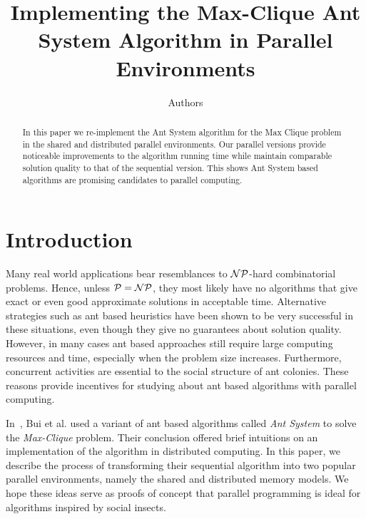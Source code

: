 \documentclass[11pt]{article}
\begin{document}
  

\title{Implementing the Max-Clique Ant System Algorithm in Parallel Environments} 
\author{
Authors\\
}  
\maketitle  
 

\begin{abstract}
In this paper we re-implement the Ant System algorithm for the Max Clique problem~\cite{BR} in the shared and distributed parallel environments. Our parallel versions provide noticeable improvements to the algorithm running time while maintain comparable solution quality to that of the sequential version.  This shows Ant System based algorithms are promising candidates to parallel computing.
\end{abstract}


\section{Introduction}\label{intro}


Many real world applications bear resemblances to  $\cal NP$-hard combinatorial problems.  Hence, unless $\cal P = NP$, they most likely have no algorithms that give exact or even good approximate solutions in acceptable time.  Alternative strategies such as ant based heuristics  have been shown to be very successful in these situations, even though they give no guarantees about solution quality.  However, in many cases ant based approaches still require large computing resources and time, especially when the problem size increases.  Furthermore, concurrent activities are essential to the social structure of ant colonies.  These reasons provide incentives for studying about ant based algorithms with parallel computing.

In~\cite{BR}, Bui et al. used a variant of ant based algorithms called \textit{Ant System} to solve the \textit{Max-Clique} problem. Their conclusion offered brief intuitions on an implementation of the algorithm in distributed computing.  In this paper, we describe the process of transforming their sequential algorithm into two popular parallel environments, namely the shared and distributed memory models. We hope these ideas serve as proofs of concept that parallel programming is ideal for algorithms inspired by social insects. %
\end{document}
